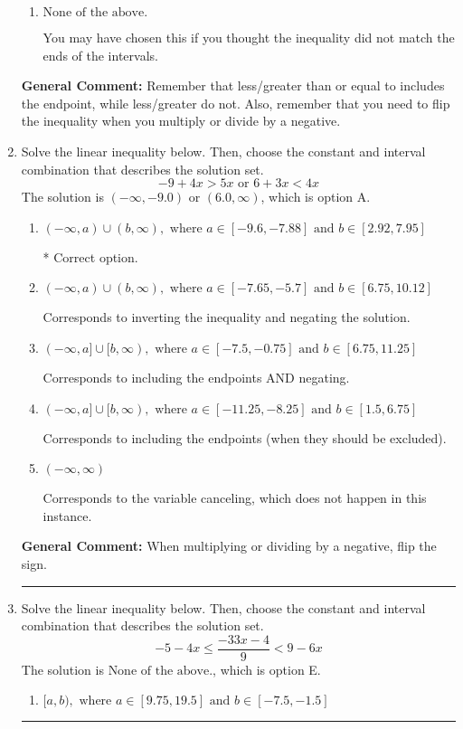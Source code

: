 \documentclass{extbook}[14pt]
\newcommand{\litem}[1]{\item #1

\rule{\textwidth}{0.4pt}}
\begin{document}
\begin{enumerate}
{\begin{enumerate}[label=\Alph*.]
 $[-4.25, \infty)$, which corresponds to switching the direction of the interval AND negating the endpoint. You likely did this if you did not flip the inequality when dividing by a negative as well as not moving values over to a side properly.
\item \( \text{None of the above}. \)

You may have chosen this if you thought the inequality did not match the ends of the intervals.
\end{enumerate}

\textbf{General Comment:} Remember that less/greater than or equal to includes the endpoint, while less/greater do not. Also, remember that you need to flip the inequality when you multiply or divide by a negative.
}
\litem{
Solve the linear inequality below. Then, choose the constant and interval combination that describes the solution set.
\[ -9 + 4 x > 5 x \text{ or } 6 + 3 x < 4 x \]The solution is \( (-\infty, -9.0) \text{ or } (6.0, \infty) \), which is option A.\begin{enumerate}[label=\Alph*.]
\item \( (-\infty, a) \cup (b, \infty), \text{ where } a \in [-9.6, -7.88] \text{ and } b \in [2.92, 7.95] \)

 * Correct option.
\item \( (-\infty, a) \cup (b, \infty), \text{ where } a \in [-7.65, -5.7] \text{ and } b \in [6.75, 10.12] \)

Corresponds to inverting the inequality and negating the solution.
\item \( (-\infty, a] \cup [b, \infty), \text{ where } a \in [-7.5, -0.75] \text{ and } b \in [6.75, 11.25] \)

Corresponds to including the endpoints AND negating.
\item \( (-\infty, a] \cup [b, \infty), \text{ where } a \in [-11.25, -8.25] \text{ and } b \in [1.5, 6.75] \)

Corresponds to including the endpoints (when they should be excluded).
\item \( (-\infty, \infty) \)

Corresponds to the variable canceling, which does not happen in this instance.
\end{enumerate}

\textbf{General Comment:} When multiplying or dividing by a negative, flip the sign.
}
\litem{
Solve the linear inequality below. Then, choose the constant and interval combination that describes the solution set.
\[ -5 - 4 x \leq \frac{-33 x - 4}{9} < 9 - 6 x \]The solution is \( \text{None of the above.} \), which is option E.\begin{enumerate}[label=\Alph*.]
\item \( [a, b), \text{ where } a \in [9.75, 19.5] \text{ and } b \in [-7.5, -1.5] \)


\end{enumerate}}
\end{enumerate}
\end{document}
